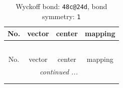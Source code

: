 \documentclass[fleqn,8pt]{jsarticle}
\begin{document}
\renewcommand{\arraystretch}{1.2}
\begin{longtable}{cccc}
\caption{Wyckoff bond: {\tt 48c@24d}, bond symmetry: {\tt 1}}
 \\
 \hline \hline
No. & vector & center & mapping \\ \hline \endfirsthead

\multicolumn{3}{l}{\tablename\ \thetable{}} \\
 \hline \hline
No. & vector & center & mapping \\ \hline \endhead

 \hline \hline
\multicolumn{3}{r}{\footnotesize\it continued ...} \\ \endfoot

 \hline \hline
\multicolumn{3}{r}{} \\ \endlastfoot


\end{longtable}
\end{document}
